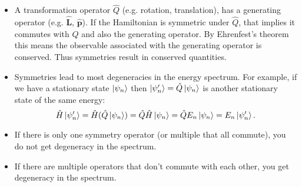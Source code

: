 \documentclass{article}
\renewcommand{\vec}[1]{\boldsymbol{\mathbf{#1}}}
\newcommand{\uvec}[1]{\hat{\vec{#1}}}
\begin{document}
\begin{itemize}
  \item A transformation operator $\hat{Q}$ (e.g. rotation, translation), has a generating operator (e.g. $\uvec{L}$, $\uvec{p}$). If the Hamiltonian is symmetric under $\hat{Q}$, that implies it commutes with $\hat{Q}$ and also the generating operator. By Ehrenfest's theorem this means the observable associated with the generating operator is conserved. Thus symmetries result in conserved quantities.

  \item Symmetries lead to most degeneracies in the energy spectrum. For example, if we have a stationary state $\ket{\psi_n}$ then $\ket{\psi_n'} = \hat{Q} \ket{\psi_n}$ is another stationary state of the same energy: \[\hat{H} \ket{\psi_n'} = \hat{H} (\hat{Q} \ket{\psi_n}) = \hat{Q} \hat{H} \ket{\psi_n} = \hat{Q} E_n \ket{\psi_n} = E_n \ket{\psi_n'}.\]

  \item If there is only one symmetry operator (or multiple that all commute), you do not get degeneracy in the spectrum.

  \item If there are multiple operators that don't commute with each other, you get degeneracy in the spectrum.
\end{itemize}
\end{document}
